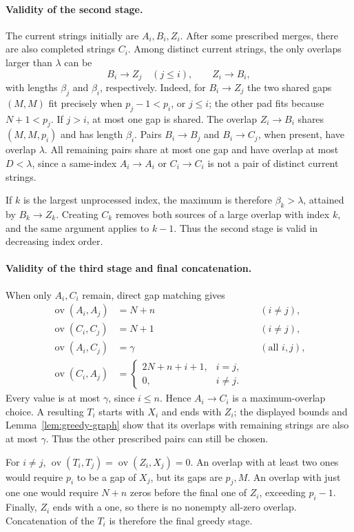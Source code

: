 \documentclass[11pt,a4paper]{article}   %
\theoremstyle{compact}
\theoremstyle{compactdef}
\newcommand{\ov}{\operatorname{ov}}         %
\begin{document}
\paragraph{Validity of the second stage.}
The current strings initially are $A_i,B_i,Z_i$. After some prescribed
merges, there are also completed strings $C_i$. Among distinct current
strings, the only overlaps larger than $\lambda$ can be
\[
 B_i\to Z_j\quad(j\le i),\qquad Z_i\to B_i,
\]
with lengths $\beta_j$ and $\beta_i$, respectively.
Indeed, for $B_i\to Z_j$ the two shared gaps $(M,M)$ fit precisely when
$p_j-1<p_i$, or $j\le i$; the other pad fits because $N+1<p_j$.
If $j>i$, at most one gap is shared. The overlap $Z_i\to B_i$
shares $(M,M,p_i)$ and has length $\beta_i$.
Pairs $B_i\to B_j$ and $B_i\to C_j$, when present, have overlap
$\lambda$. All remaining pairs share at most one gap and have overlap
at most $D<\lambda$, since a same-index $A_i\to A_i$ or
$C_i\to C_i$ is not a pair of distinct current strings.

If $k$ is the largest unprocessed index, the maximum is therefore
$\beta_k>\lambda$, attained by $B_k\to Z_k$. Creating $C_k$ removes
both sources of a large overlap with index $k$, and the same argument
applies to $k-1$. Thus the second stage is valid in decreasing index order.

\paragraph{Validity of the third stage and final concatenation.}
When only $A_i,C_i$ remain, direct gap matching gives
\[
\begin{aligned}
 \ov(A_i,A_j)&=N+n &&(i\ne j),\\
 \ov(C_i,C_j)&=N+1 &&(i\ne j),\\
 \ov(A_i,C_j)&=\gamma &&(\text{all }i,j),\\
 \ov(C_i,A_j)&=
 \begin{cases}
 2N+n+i+1,&i=j,\\
 0,&i\ne j.
 \end{cases}
\end{aligned}
\]
Every value is at most $\gamma$, since $i\le n$.
Hence $A_i\to C_i$ is a maximum-overlap choice. A resulting $T_i$
starts with $X_i$ and ends with $Z_i$; the displayed bounds and
Lemma~\ref{lem:greedy-graph} show that its overlaps with remaining
strings are also at most $\gamma$. Thus the other prescribed pairs can
still be chosen.

For $i\ne j$, $\ov(T_i,T_j)=\ov(Z_i,X_j)=0$. An overlap with at least
two ones would require $p_i$ to be a gap of $X_j$, but its gaps are
$p_j,M$. An overlap with just one one would require $N+n$ zeros before
the final one of $Z_i$, exceeding $p_i-1$. Finally, $Z_i$ ends with a
one, so there is no nonempty all-zero overlap. Concatenation of the
$T_i$ is therefore the final greedy stage.
\end{document}
